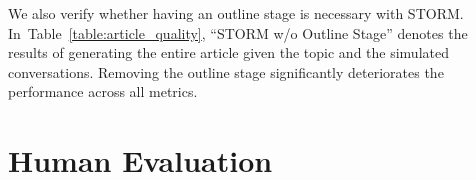 \documentclass[11pt]{article}
\newcommand{\system}[0]{STORM\xspace}
\newcommand{\reftab}[1]{Table~\ref{#1}}
\begin{document}
We also verify whether having an outline stage is necessary with \system. In~\reftab{table:article_quality}, ``\system w/o Outline Stage'' denotes the results of generating the entire article given the topic and the simulated conversations. %
Removing the outline stage significantly deteriorates the performance across all metrics.













\section{Human Evaluation}

\label{sec:human_eval}


\begin{table}
\centering
{}
\caption{Human evaluation results on 20 pairs of articles generated by \system and \textit{oRAG}. Each pair of articles is evaluated by two Wikipedia editors.
The ratings are given on a scale between 1 and 7, with values $\geq4$ indicating good quality (see~\reftab{table:human_eval_rubric}). We conduct paired $t$-test and report the $p$-value.}
\label{table:human_eval}
\vspace{-0.7em}
\end{table}
\end{document}
